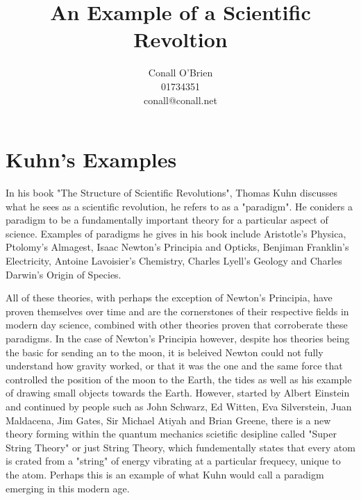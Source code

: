 \documentclass[a4paper,12pt]{article}
\begin{document}
\title{An Example of a Scientific Revoltion}

\author{Conall O'Brien \\ 01734351 \\ conall@conall.net}

\maketitle

\section*{Kuhn's Examples}

In his book "The Structure of Scientific Revolutions", Thomas Kuhn
discusses what he sees as a scientific revolution, he refers to as a
"paradigm". He coniders a paradigm to be a fundamentally important
theory for a particular aspect of science. Examples of paradigms he 
gives in his book include Aristotle's Physica, Ptolomy's Almagest, 
Isaac Newton's Principia and Opticks, Benjiman Franklin's Electricity, 
Antoine Lavoisier's Chemistry, Charles Lyell's Geology and Charles 
Darwin's Origin of Species.

\vspace{10mm}

\noindent All of these theories, with perhaps the exception of Newton's 
Principia, have proven themselves over time and are the cornerstones of
their respective fields in modern day science, combined with other 
theories proven that corroberate these paradigms. In the case of 
Newton's Principia however, despite hos theories being the basic for 
sending an to the moon, it is beleived Newton could not fully understand 
how gravity worked, or that it was the one and the same force that
controlled the position of the moon to the Earth, the tides as well as
his example of drawing small objects towards the Earth. However, started
by Albert Einstein and continued by people such as John Schwarz, Ed
Witten, Eva Silverstein, Juan Maldacena, Jim Gates, Sir Michael
Atiyah and Brian Greene, there is a new theory forming within the quantum
mechanics scietific desipline called "Super String Theory" or just
String Theory, which fundementally states that every atom is crated from
a "string" of energy vibrating at a particular frequecy, unique to the
atom. Perhaps this is an example of what Kuhn would call a paradigm
emerging in this modern age.
\end{document}
